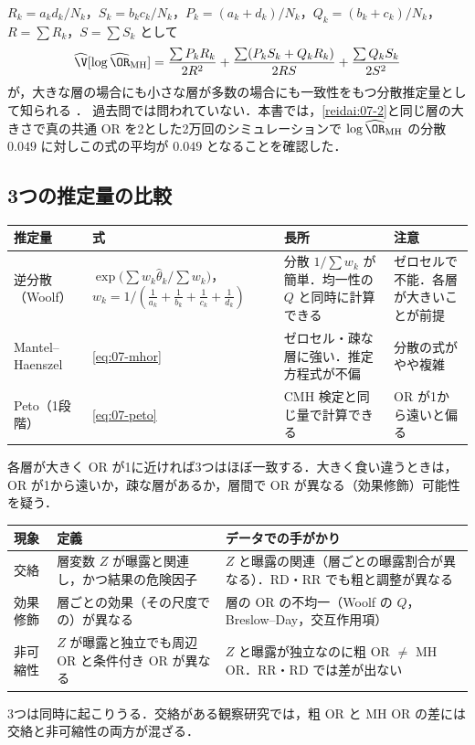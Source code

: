 \begin{supbox}
$R_k=a_kd_k/N_k$，$S_k=b_kc_k/N_k$，$P_k=(a_k+d_k)/N_k$，$Q_k=(b_k+c_k)/N_k$，$R=\sum R_k$，$S=\sum S_k$ として
\[
\widehat\V[\log\widehat\OR_{\mathrm{MH}}]=\frac{\sum P_kR_k}{2R^2}+\frac{\sum(P_kS_k+Q_kR_k)}{2RS}+\frac{\sum Q_kS_k}{2S^2}
\]
が，大きな層の場合にも小さな層が多数の場合にも一致性をもつ分散推定量として知られる \cite{rbg1986}．
過去問では問われていない．本書では，\cref{reidai:07-2}と同じ層の大きさで真の共通 OR を2とした2万回のシミュレーションで $\log\widehat\OR_{\mathrm{MH}}$ の分散 $0.049$ に対しこの式の平均が $0.049$ となることを確認した．
\end{supbox}

\subsection{3つの推定量の比較}\label{subsec:07-compare}
\begin{center}\small
\begin{tabular}{@{}L{22mm}L{44mm}L{36mm}L{38mm}@{}}
\toprule
推定量 & 式 & 長所 & 注意\\
\midrule
逆分散（Woolf） & $\exp\bigl(\sum w_k\hat\theta_k/\sum w_k\bigr)$，$w_k=1/(\frac1{a_k}+\frac1{b_k}+\frac1{c_k}+\frac1{d_k})$ & 分散 $1/\sum w_k$ が簡単．均一性の $Q$ と同時に計算できる & ゼロセルで不能．各層が大きいことが前提\\
Mantel--Haenszel & \cref{eq:07-mhor} & ゼロセル・疎な層に強い．推定方程式が不偏 & 分散の式がやや複雑\\
Peto（1段階） & \cref{eq:07-peto} & CMH 検定と同じ量で計算できる & OR が1から遠いと偏る\\
\bottomrule
\end{tabular}
\end{center}
各層が大きく OR が1に近ければ3つはほぼ一致する．大きく食い違うときは，OR が1から遠いか，疎な層があるか，層間で OR が異なる（効果修飾）可能性を疑う．

\begin{pointbox}
\begin{center}\small
\begin{tabular}{@{}L{24mm}L{58mm}L{58mm}@{}}
\toprule
現象 & 定義 & データでの手がかり\\
\midrule
交絡 & 層変数 $Z$ が曝露と関連し，かつ結果の危険因子 & $Z$ と曝露の関連（層ごとの曝露割合が異なる）．RD・RR でも粗と調整が異なる\\
効果修飾 & 層ごとの効果（その尺度での）が異なる & 層の OR の不均一（Woolf の $Q$，Breslow--Day，交互作用項）\\
非可縮性 & $Z$ が曝露と独立でも周辺 OR と条件付き OR が異なる & $Z$ と曝露が独立なのに粗 OR $\ne$ MH OR．RR・RD では差が出ない\\
\bottomrule
\end{tabular}
\end{center}
3つは同時に起こりうる．交絡がある観察研究では，粗 OR と MH OR の差には交絡と非可縮性の両方が混ざる．
\end{pointbox}

